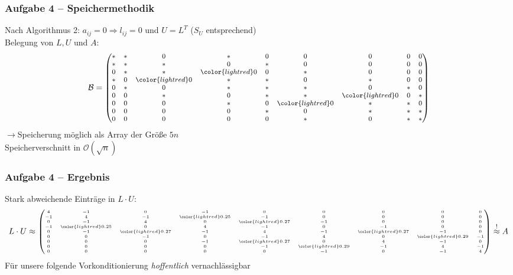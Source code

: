 \documentclass[german,notes,18pt]{beamer}
\begin{document}
	\begin{frame}
		\frametitle{Aufgabe 4 -- Speichermethodik}
		Nach Algorithmus 2: $a_{ij}=0\Rightarrow l_{ij}=0$ und $U=L^T$ ($S_U$ entsprechend) \\
		Belegung von $L,U$ und $A$:
		\begin{equation*}
			\footnotesize
			\mathcal{B}=\begin{pmatrix}
			* & * & 0 & * & 0 & 0 & 0 & 0 & 0 \\
			* & * & * & 0 & * & 0 & 0 & 0 & 0 \\
			0 & * & * & \color{lightred}0 & 0 & * & 0 & 0 & 0 \\
			* & 0 & \color{lightred}0 & * & * & 0 & * & 0 & 0 \\
			0 & * & 0 & * & * & * & 0 & * & 0 \\
			0 & 0 & * & 0 & * & * & \color{lightred}0 & 0 & * \\
			0 & 0 & 0 & * & 0 & \color{lightred}0 & * & * & 0 \\
			0 & 0 & 0 & 0 & * & 0 & * & * & * \\
			0 & 0 & 0 & 0 & 0 & * & 0 & * & *
			\end{pmatrix}
		\end{equation*}
		$\rightarrow$Speicherung möglich als Array der Größe $5n$ \\
		{\color{lightred}Speicherverschnitt} in $\mathcal{O}(\sqrt{n})$
	\end{frame}
	\begin{frame}
		\frametitle{Aufgabe 4 -- Ergebnis}
		Stark abweichende Einträge in $L\cdot U$:
		\begin{equation*}
		\tiny
		L\cdot U\approx \begin{pmatrix}
		4 & -1 &  0 & -1 &  0 & 0 &  0  & 0  & 0 \\
		-1  & 4 & -1 &  \color{lightred}0.25 & -1 &  0 &  0 &  0 &  0 \\
		0 & -1  & 4 &  0 &  \color{lightred}0.27 & -1  & 0  & 0  & 0 \\
		-1 &  \color{lightred}0.25 &  0 &  4 & -1 &  0 & -1 &  0 &  0 \\
		0 & -1 &  \color{lightred}0.27 & -1 &  4 & -1  & \color{lightred}0.27 & -1 &  0 \\
		0 &  0 & -1 &  0 & -1 &  4 &  0 & \color{lightred}0.29 & -1 \\
		0 &  0 &  0 & -1 &  \color{lightred}0.27 &  0 &  4 & -1 &  0 \\
		0 &  0 &  0 &  0 & -1 &  \color{lightred}0.29 & -1 &  4 & -1 \\
		0 &  0 &  0 &  0 &  0 & -1 &  0 & -1 &  4
		\end{pmatrix}
		\stackrel{!}{\approx}A
		\end{equation*}
		\vspace{2em}
		Für unsere folgende Vorkonditionierung \emph{hoffentlich} vernachlässigbar
	\end{frame}
\end{document}
